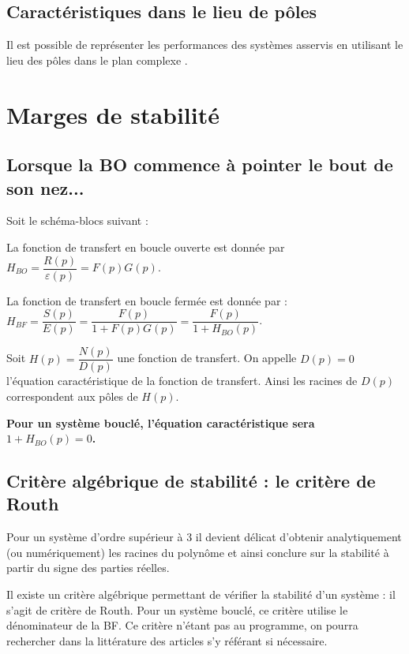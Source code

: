 \documentclass[10pt,fleqn]{article} %
\begin{document}
\subsection{Caractéristiques dans le lieu de pôles}
Il est possible de représenter les performances des systèmes asservis en utilisant le lieu des pôles dans le plan complexe \cite{1}. 

\section{Marges de stabilité}
\subsection{Lorsque la BO commence à pointer le bout de son nez...}


Soit le schéma-blocs suivant : 

\begin{center}

\end{center}

La fonction de transfert en boucle ouverte est donnée par $H_{BO}=\dfrac{R(p)}{\varepsilon(p)}=F(p)G(p)$. 

La fonction de transfert en boucle fermée est donnée par : $H_{BF}=\dfrac{S(p)}{E(p)}=\dfrac{F(p)}{1+F(p)G(p)}=\dfrac{F(p)}{1+H_{BO}(p)}$. 

\begin{defi}
Soit $H(p)=\dfrac{N(p)}{D(p)}$ une fonction de transfert. On appelle $D(p)=0$ l'équation caractéristique de la fonction de transfert. Ainsi les racines de $D(p)$ correspondent aux pôles de $H(p)$.
\end{defi}

\textbf{Pour un système bouclé, l'équation caractéristique sera $1+H_{BO}(p)=0$.}

\subsection{Critère algébrique de stabilité : le critère de Routh}
Pour un système d'ordre supérieur à 3 il devient délicat d'obtenir analytiquement (ou numériquement) les racines du polynôme et ainsi conclure sur la stabilité à partir du signe des parties réelles. 

Il existe un critère algébrique permettant de vérifier la stabilité d'un système : il s'agit de critère de Routh. Pour un système bouclé, ce critère utilise le dénominateur de la BF. Ce critère n'étant pas au programme, on pourra rechercher dans la littérature des articles s'y référant si nécessaire. 
\end{document}

